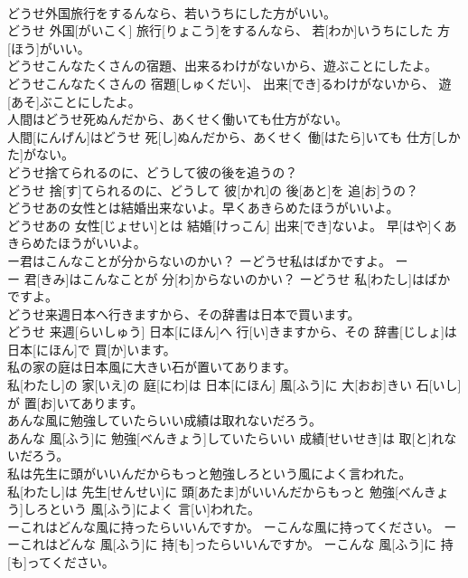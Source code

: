 \documentclass[8pt]{extreport}
\begin{document}
\begin{CJK}{UTF8}{min}
\\	どうせ外国旅行をするんなら、若いうちにした方がいい。	
\\	どうせ 外国[がいこく] 旅行[りょこう]をするんなら、 若[わか]いうちにした 方[ほう]がいい。
\\	どうせこんなたくさんの宿題、出来るわけがないから、遊ぶことにしたよ。	
\\	どうせこんなたくさんの 宿題[しゅくだい]、 出来[でき]るわけがないから、 遊[あそ]ぶことにしたよ。
\\	人間はどうせ死ぬんだから、あくせく働いても仕方がない。	
\\	人間[にんげん]はどうせ 死[し]ぬんだから、あくせく 働[はたら]いても 仕方[しかた]がない。
\\	どうせ捨てられるのに、どうして彼の後を追うの？	
\\	どうせ 捨[す]てられるのに、どうして 彼[かれ]の 後[あと]を 追[お]うの？
\\	どうせあの女性とは結婚出来ないよ。早くあきらめたほうがいいよ。	
\\	どうせあの 女性[じょせい]とは 結婚[けっこん] 出来[でき]ないよ。 早[はや]くあきらめたほうがいいよ。
\\	ー君はこんなことが分からないのかい？ ーどうせ私はばかですよ。	ー
\\	ー 君[きみ]はこんなことが 分[わ]からないのかい？ ーどうせ 私[わたし]はばかですよ。
\\	どうせ来週日本へ行きますから、その辞書は日本で買います。	
\\	どうせ 来週[らいしゅう] 日本[にほん]へ 行[い]きますから、その 辞書[じしょ]は 日本[にほん]で 買[か]います。
\\	私の家の庭は日本風に大きい石が置いてあります。	
\\	私[わたし]の 家[いえ]の 庭[にわ]は 日本[にほん] 風[ふう]に 大[おお]きい 石[いし]が 置[お]いてあります。
\\	あんな風に勉強していたらいい成績は取れないだろう。	
\\	あんな 風[ふう]に 勉強[べんきょう]していたらいい 成績[せいせき]は 取[と]れないだろう。
\\	私は先生に頭がいいんだからもっと勉強しろという風によく言われた。	
\\	私[わたし]は 先生[せんせい]に 頭[あたま]がいいんだからもっと 勉強[べんきょう]しろという 風[ふう]によく 言[い]われた。
\\	ーこれはどんな風に持ったらいいんですか。 ーこんな風に持ってください。	ー
\\	ーこれはどんな 風[ふう]に 持[も]ったらいいんですか。 ーこんな 風[ふう]に 持[も]ってください。

\end{CJK}
\end{document}
